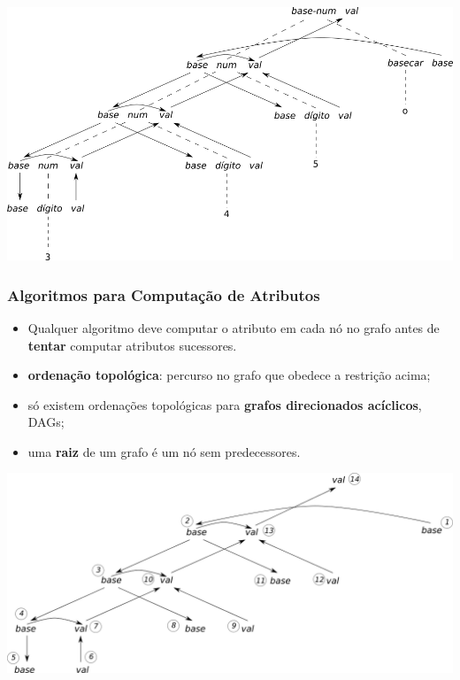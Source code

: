 \documentclass[table]{beamer}
\begin{document}
\begin{frame}
   \includegraphics[width=\linewidth,height=\textheight,keepaspectratio]{figuras/exemplo68completo.png}
\end{frame}

\begin{frame}
   \frametitle{Algoritmos para Computação de Atributos}
   \begin{itemize}
      \item Qualquer algoritmo deve computar o atributo em cada nó no grafo antes de \textbf{tentar} computar atributos sucessores.
      \item \textbf{ordenação topológica}: percurso no grafo que obedece a restrição acima;
      \item só existem ordenações topológicas para \textbf{grafos direcionados acíclicos}, DAGs;
      \item uma \textbf{raiz} de um grafo é um nó sem predecessores.
   \end{itemize}
\end{frame}

\begin{frame}
   \includegraphics[width=\linewidth,height=\textheight,keepaspectratio]{figuras/exemplo68grafo.png}
\end{frame}
\end{document}
